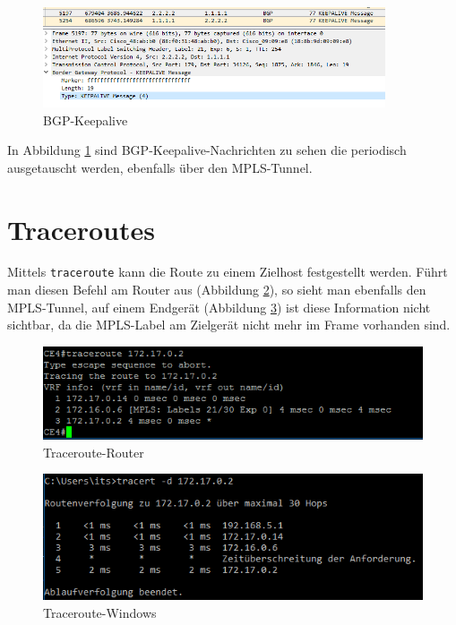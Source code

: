 \begin{figure}[H]
	\centering
	\includegraphics[width=0.9\textwidth]{img/bgp_wireshark.png}
	\caption{BGP-Keepalive}
	\label{img:bgp}
\end{figure}

In Abbildung \ref{img:bgp} sind \ac{BGP}-Keepalive-Nachrichten zu sehen die periodisch ausgetauscht werden, ebenfalls über den \ac{MPLS}-Tunnel.

\section{Traceroutes}

Mittels \texttt{traceroute} kann die Route zu einem Zielhost festgestellt werden. Führt man diesen Befehl am Router aus (Abbildung \ref{img:trace_router}), so sieht man ebenfalls den \ac{MPLS}-Tunnel, auf einem Endgerät (Abbildung \ref{img:trace_win}) ist diese Information nicht sichtbar, da die MPLS-Label am Zielgerät nicht mehr im Frame vorhanden sind.

\begin{figure}[H]
	\centering
	\includegraphics[width=1.0\textwidth]{data/traceroute_router.PNG}
	\caption{Traceroute-Router}
	\label{img:trace_router}
\end{figure}

\begin{figure}[H]
	\centering
	\includegraphics[width=1.0\textwidth]{data/traceroute_windows2.PNG}
	\caption{Traceroute-Windows}
	\label{img:trace_win}
\end{figure}